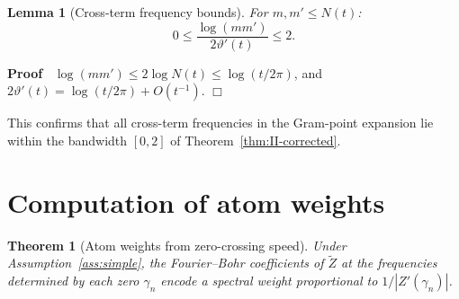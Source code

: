 \documentclass{article}
\newenvironment{proof}{\noindent\textbf{Proof\ }}{\hspace*{\fill}$\Box$\medskip}
\newtheorem{lemma}{Lemma}
\newtheorem{theorem}{Theorem}
\begin{document}
\begin{lemma}
  [Cross-term frequency bounds]\label{lem:cross-freq} For $m, m' \le N (t)$:
  \begin{equation}
    \label{eq:cross-freq} 0 \le \frac{\log (mm')}{2 \vartheta' (t)} \le 2.
  \end{equation}
\end{lemma}

\begin{proof}
  $\log (mm') \le 2 \log N (t) \le \log (t / 2 \pi)$, and $2 \vartheta' (t) =
  \log (t / 2 \pi) + O (t^{- 1})$.
\end{proof}

This confirms that all cross-term frequencies in the Gram-point expansion lie
within the bandwidth $[0, 2]$ of Theorem~\ref{thm:II-corrected}.

\section{Computation of atom weights}\label{sec:weights}

\begin{theorem}
  [Atom weights from zero-crossing speed]\label{thm:weights} Under
  Assumption~\ref{ass:simple}, the Fourier--Bohr coefficients of $\tilde{Z}$
  at the frequencies determined by each zero $\gamma_n$ encode a spectral
  weight proportional to $1 / |Z' (\gamma_n) |$.
\end{theorem}
\end{document}
